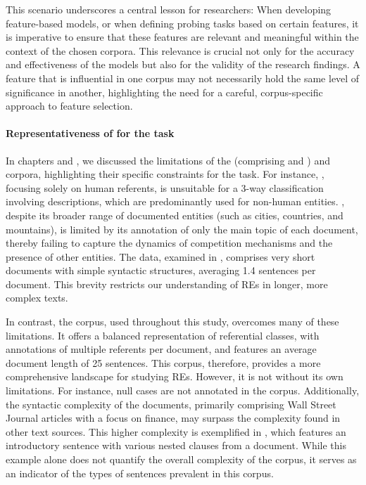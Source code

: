 This scenario underscores a central lesson for researchers: When developing feature-based models, or when defining probing tasks based on certain features, it is imperative to ensure that these features are relevant and meaningful within the context of the chosen corpora. This relevance is crucial not only for the accuracy and effectiveness of the models but also for the validity of the research findings. A feature that is influential in one corpus may not necessarily hold the same level of significance in another, highlighting the need for a careful, corpus-specific approach to feature selection.

\paragraph*{Representativeness of \wsj for the \context task}


In chapters \4 and \7, we discussed the limitations of the \grec (comprising \grectwo and \grecp) and \webnlg corpora, highlighting their specific constraints for the \context task. For instance, \grecp, focusing solely on human referents, is unsuitable for a 3-way classification involving descriptions, which are predominantly used for non-human entities. \grectwo, despite its broader range of documented entities (such as cities, countries, and mountains), is limited by its annotation of only the main topic of each document, thereby failing to capture the dynamics of competition mechanisms and the presence of other entities. The \webnlg data, examined in , comprises very short documents with simple syntactic structures, averaging 1.4 sentences per document. This brevity restricts our understanding of REs in longer, more complex texts.

In contrast, the \wsj corpus, used throughout this study, overcomes many of these limitations. It offers a balanced representation of referential classes, with annotations of multiple referents per document, and features an average document length of 25 sentences. This corpus, therefore, provides a more comprehensive landscape for studying REs. However, it is not without its own limitations. For instance, null cases are not annotated in the \wsj corpus. Additionally, the syntactic complexity of the \wsj documents, primarily comprising Wall Street Journal articles with a focus on finance, may surpass the complexity found in other text sources. This higher complexity is exemplified in , which features an introductory sentence with various nested clauses from a \wsj document. While this example alone does not quantify the overall complexity of the \wsj corpus, it serves as an indicator of the types of sentences prevalent in this corpus.

